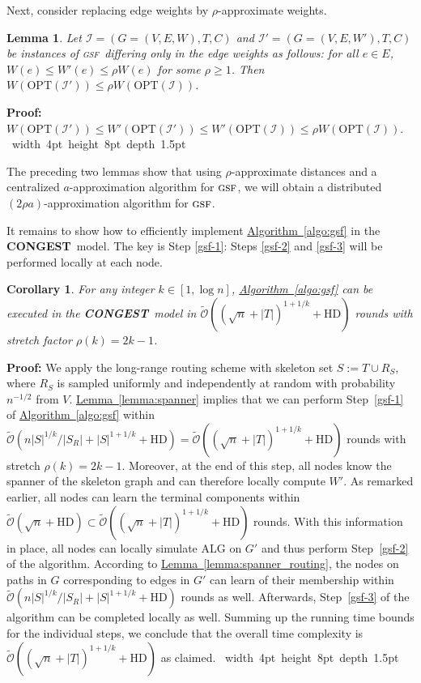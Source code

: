 \documentclass[letterpaper,11pt]{article}
\newcommand{\namedref}[2]{\hyperref[#2]{#1~\ref*{#2}}}
\newcommand{\lemmaref}[1]{\namedref{Lemma}{#1}}
\newcommand{\algref}[1]{\namedref{Algorithm}{#1}}
\newtheorem{lemma}[theorem]{Lemma}
\newtheorem{corollary}[theorem]{Corollary}
\newcommand{\blackslug}{\hbox{\hskip 1pt \vrule width 4pt height 8pt
depth 1.5pt \hskip 1pt}}
\newcommand{\QED}{\quad\blackslug\lower 8.5pt\null\par}
\newenvironment{proof}[1][Proof:]{\noindent \textbf{#1}\xspace}{\QED}
\newcommand{\BO}{\mathcal{O}}
\newcommand{\CONGEST}{\textbf{CONGEST}}
\newcommand{\HD}{\mathrm{HD}}
\newcommand{\gsf}{\textsc{gsf}}
\newcommand{\OPT}{\mathrm{OPT}}
\newcommand{\ALG}{\mathrm{ALG}}
\newcommand{\cI}{\mathcal{I}}
\begin{document}
Next, consider replacing edge weights by $\rho$-approximate weights.
\begin{lemma}\label{lem-gsf-appx}
Let $\cI=\left(G=(V,E,W),T,C\right)$ and
$\cI'=\left(G=(V,E,W'),T,C\right)$ be instances of \gsf\
differing only in the edge weights as follows: for all $e\in E$,
$W(e)\le W'(e)\le \rho W(e)$ for some $\rho\ge1$. Then $W(\OPT(\cI'))\le \rho
W(\OPT(\cI))$.
\end{lemma}
\begin{proof}
$W(\OPT(\cI'))\leq W'(\OPT(\cI'))\leq W'(\OPT(\cI))\leq \rho W(\OPT(\cI))$.
\end{proof}

The preceding two lemmas show that using $\rho$-approximate distances and a
centralized $a$-approxima\-tion algorithm for $\gsf$, we will obtain a
distributed $(2\rho a)$-approximation algorithm for $\gsf$.

It remains to show how to efficiently implement \algref{algo:gsf} in the
\CONGEST\ model. The key is Step \ref{gsf-1}: Steps \ref{gsf-2} and
\ref{gsf-3} will be performed locally at each node.
\begin{corollary}\label{coro:gsf_impl}
For any integer $k\in [1,\log n]$, \algref{algo:gsf} can be
executed in the \CONGEST\ model in
$\tilde{\BO}((\sqrt{n}+|T|)^{1+1/k}+\HD)$ rounds with stretch factor 
$\rho(k)=2k-1$.
\end{corollary}
\begin{proof}
We apply the long-range routing scheme with skeleton set $S:=T\cup R_S$, where
$R_S$ is sampled uniformly and independently at random with probability
$n^{-1/2}$ from $V$. \lemmaref{lemma:spanner} implies that we can perform
Step~\ref{gsf-1} of \algref{algo:gsf} within
$\tilde{\BO}(n|S|^{1/k}/|S_R|+|S|^{1+1/k}+\HD)
=\tilde{\BO}((\sqrt{n}+|T|)^{1+1/k}+\HD)$ rounds with stretch $\rho(k)=2k-1$.
Moreover, at the end of this step, all nodes know the spanner of the skeleton
graph and can therefore locally compute $W'$. As remarked earlier, all nodes can
learn the terminal components within $\tilde{\BO}(\sqrt{n}+\HD)\subset
\tilde{\BO}((\sqrt{n}+|T|)^{1+1/k}+\HD)$ rounds. With this information in place,
all nodes can locally simulate $\ALG$ on $G'$ and thus perform Step~\ref{gsf-2}
of the algorithm. According to \lemmaref{lemma:spanner_routing}, the nodes on
paths in $G$ corresponding to edges in $G'$ can learn of their membership within
$\tilde{\BO}(n|S|^{1/k}/|S_R|+|S|^{1+1/k}+\HD)$ rounds as well. Afterwards,
Step~\ref{gsf-3} of the algorithm can be completed locally as well. Summing up
the running time bounds for the individual steps, we conclude that the overall
time complexity is $\tilde{\BO}((\sqrt{n}+|T|)^{1+1/k}+\HD)$ as claimed.
\end{proof}
\end{document}
